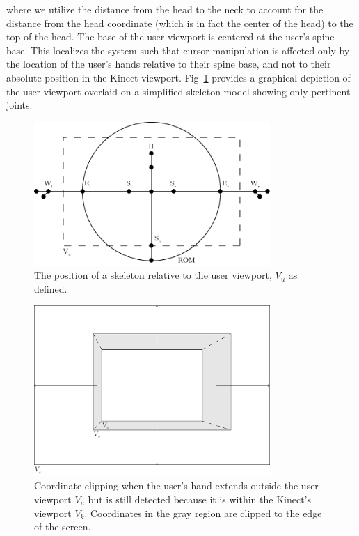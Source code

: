 \documentclass{scrartcl}
\numberwithin{equation}{section}
\begin{document}
      where we utilize the distance from the head to the neck to account for the distance from the head coordinate (which is in fact the center of the head) to the top of the head. The base of the user viewport is centered at the user's spine base. This localizes the system such that cursor manipulation is affected only by the location of the user's hands relative to their spine base, and not to their absolute position in the Kinect viewport. Fig~\ref{fig:userviewport} provides a graphical depiction of the user viewport overlaid on a simplified skeleton model showing only pertinent joints.
      \begin{figure}[ht!]
        \centering
        \includegraphics[width=0.8\textwidth]{img/User-Viewport}
        \caption{The position of a skeleton relative to the user viewport, $V_u$ as defined.\label{fig:userviewport}}
      \end{figure}
      \begin{figure}[ht!]
        \centering
        \includegraphics[width=0.8\textwidth]{img/Clipping}
        \caption{Coordinate clipping when the user's hand extends outside the user viewport $V_u$ but is still detected because it is within the Kinect's viewport $V_k$. Coordinates in the gray region are clipped to the edge of the screen.\label{fig:clipping}}
      \end{figure}
\end{document}
